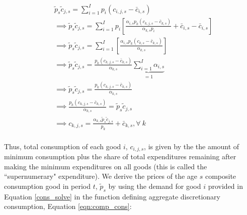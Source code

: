 \documentclass[letterpaper,12pt]{article}
\theoremstyle{definition}
\begin{document}
\begin{spacing}{1.5}
          \begin{equation} \label{eqn:cons_solve}
      \begin{split}
       & \tilde{p}_{s}\tilde{c}_{j,s} = \sum_{i=1}^{I}p_{i}(c_{i,j,s}-\bar{c}_{i,s}) \\
       & \implies  \tilde{p}_{s}\tilde{c}_{j,s} = \sum_{i=1}^{I}p_{i}\left[ \frac{\alpha_{i,s} p_{k}(c_{k,j,s}-\bar{c}_{k,s})}{\alpha_{k,s} p_{i}} + \bar{c}_{i,s}- \bar{c}_{i,s}\right] \\
       & \implies  \tilde{p}_{s}\tilde{c}_{j,s} = \sum_{i=1}^{I}\left[ \frac{\alpha_{i,s} p_{k}(c_{k,s}-\bar{c}_{k,s})}{\alpha_{k,s}}\right] \\
       & \implies  \tilde{p}_{s}\tilde{c}_{j,s} = \frac{ p_{k}(c_{k,j,s}-\bar{c}_{k,s})}{\alpha_{k,s}} \underbrace{\sum_{i=1}^{I}\alpha_{i,s}}_{=1} \\	
        & \implies  \tilde{p}_{s}\tilde{c}_{j,s} = \frac{ p_{k}(c_{k,j,s}-\bar{c}_{k,s})}{\alpha_{k,s}} \\
        & \implies  \frac{ p_{k}(c_{k,j,s}-\bar{c}_{k,s})}{\alpha_{k,s}}  = \tilde{p}_{s}\tilde{c}_{j,s}   \\	
        & \implies  c_{k,j,s}  = \frac{\alpha_{k,s} \tilde{p}_{s}\tilde{c}_{j,s}}{p_{k}} + \bar{c}_{k,s},  \forall \ k  \\	
       \end{split}
    \end{equation}
    
    Thus, total consumption of each good $i$, $c_{i,j,s}$, is given by the the amount of minimum consumption plus the share of total expenditures remaining after making the minimum expenditures on all goods (this is called the ``supernumerary" expenditure).  We derive the prices of the age $s$ composite consumption good in period $t$, $\tilde{p}_{s}$ by using the demand for good $i$ provided in Equation \ref{cons_solve} in the function defining aggregate discretionary consumption, Equation \ref{eqn:comp_cons}: 
    

\end{spacing}
\end{document}
